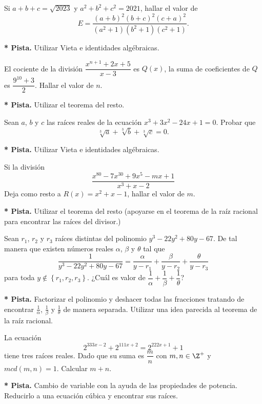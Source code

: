 \begin{problem}
    Si $a + b + c = \sqrt{2023}$ y $a^2 + b^2 + c^2 = 2021$, hallar el valor de
    \[
        E = \frac{(a + b)^2 (b + c)^2 (c + a)^2}{(a^2 + 1) (b^2 + 1) (c^2 + 1)}.
    \]
\end{problem}
\textbf{* Pista.} Utilizar Vieta e identidades algébraicas.

\begin{problem}
    El cociente de la división $\dfrac{x^{n + 1} + 2x + 5}{x - 3}$ es $Q(x)$, la suma de coeficientes de $Q$ es $\dfrac{9^{10} + 3}{2}$.
    Hallar el valor de $n$.
\end{problem}
\textbf{* Pista.} Utilizar el teorema del resto.

\begin{problem}
    Sean $a$, $b$ y $c$ las raíces reales de la ecuación $x^3 + 3x^2 - 24x + 1 = 0$.
    Probar que
    \[
        \sqrt[3]{a} + \sqrt[3]{b} + \sqrt[3]{c} = 0.
    \]
\end{problem}
\textbf{* Pista.} Utilizar Vieta e identidades algébraicas.

\begin{problem}
    Si la división
    \[\frac{x^{80} - 7 x^{30} + 9x^5 - mx + 1}{x^3 + x - 2}\]
    Deja como resto a $R(x) = x^2 + x - 1$, hallar el valor de $m$.
\end{problem}
\textbf{* Pista.} Utilizar el teorema del resto (apoyarse en el teorema de la raíz racional para encontrar las raíces del divisor.)


\begin{problem}
    Sean $r_1$, $r_2$ y $r_3$ raíces distintas del polinomio $y^3 - 22 y^2 + 80 y - 67$.
    De tal manera que existen números reales $\alpha$, $\beta$ y $\theta$ tal que
    \[
        \frac{1}{y^3 - 22 y^2 + 80 y - 67} = \frac{\alpha}{y - r_1} + \frac{\beta}{y - r_2} + \frac{\theta}{y - r_3}
    \]
    para toda $y \notin \left\{ r_1, r_2, r_3 \right\}$.
    ¿Cuál es valor de $\dfrac{1}{\alpha} + \dfrac{1}{\beta} + \dfrac{1}{\theta}$?
\end{problem}
\textbf{* Pista.} Factorizar el polinomio y deshacer todas las fracciones tratando de encontrar $\frac{1}{\alpha}$, $\frac{1}{\beta}$ y $\frac{1}{\theta}$ de manera separada.
Utilizar una idea parecida al teorema de la raíz racional.

\begin{problem}
    La ecuación
    \[
        2^{333x - 2} + 2^{111x + 2} = 2^{222x + 1} + 1
    \]
    tiene tres raíces reales.
    Dado que su suma es $\dfrac{m}{n}$ con $m, n \in \Z^{+}$ y $mcd(m, n) = 1$.
    Calcular $m + n$.
\end{problem}
\textbf{* Pista.} Cambio de variable con la ayuda de las propiedades de potencia.
Reducirlo a una ecuación cúbica y encontrar sus raíces.


